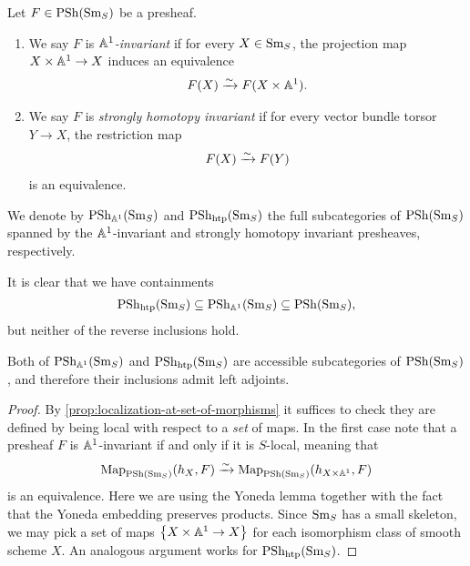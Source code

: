 \documentclass[11pt]{amsart}
\renewcommand{\Pre}{\mathrm{PSh}}
\begin{document}
\begin{definition} Let $F \in \mathrm{PSh}(\mathrm{Sm}_S)$ be a presheaf.
\begin{enumerate}
    \item We say $F$ is $\mathbb{A}^1$\textit{-invariant} if for every $X \in \mathrm{Sm}_S$, the projection map $X \times \mathbb{A}^1 \to X$ induces an equivalence
    \begin{align*}
        F(X) \xrightarrow{\sim} F(X \times \mathbb{A}^1).
    \end{align*}
    \item We say $F$ is \textit{strongly homotopy invariant} if for every vector bundle torsor $Y \to X$, the restriction map
    \begin{align*}
        F(X) \xrightarrow{\sim} F(Y)
    \end{align*}
    is an equivalence.
\end{enumerate}
We denote by $\Pre_{\A^1}(\Sm_S)$ and $\Pre_{\htp}(\Sm_S)$ the full subcategories of $\Pre(\Sm_S)$ spanned by the $\mathbb{A}^1$-invariant and strongly homotopy invariant presheaves, respectively.
\end{definition}

\begin{remark} It is clear that we have containments
\begin{align*}
    \Pre_{\htp}(\Sm_S) \subseteq \Pre_{\A^1}(\Sm_S) \subseteq \Pre(\Sm_S),
\end{align*}
but neither of the reverse inclusions hold.
\end{remark}

\begin{proposition} Both of $\Pre_{\A^1}(\Sm_S)$ and $\Pre_{\htp}(\Sm_S)$ are accessible subcategories of $\Pre(\Sm_S)$, and therefore their inclusions admit left adjoints.
\end{proposition}
\begin{proof} By \autoref{prop:localization-at-set-of-morphisms} it suffices to check they are defined by being local with respect to a \textit{set} of maps. In the first case note that
a presheaf $F$ is $\mathbb{A}^1$-invariant if and only if it is $S$-local, meaning that
\begin{align*}
    \mathrm{Map}_{\mathrm{PSh}(\mathrm{Sm}_S)}(h_{X},F) \xrightarrow{\sim} \mathrm{Map}_{\mathrm{PSh}(\mathrm{Sm}_S)}(h_{X \times \mathbb{A}^1},F)
\end{align*}
is an equivalence. Here we are using the Yoneda lemma together with the fact that the Yoneda embedding preserves products. Since $\mathrm{Sm}_S$ has a small skeleton, we may pick a set of maps $\left\{ X \times \mathbb{A}^1 \to X \right\}$ for each isomorphism class of smooth scheme $X$. An analogous argument works for $\Pre_{\htp}(\Sm_S)$.
\end{proof}
\end{document}
